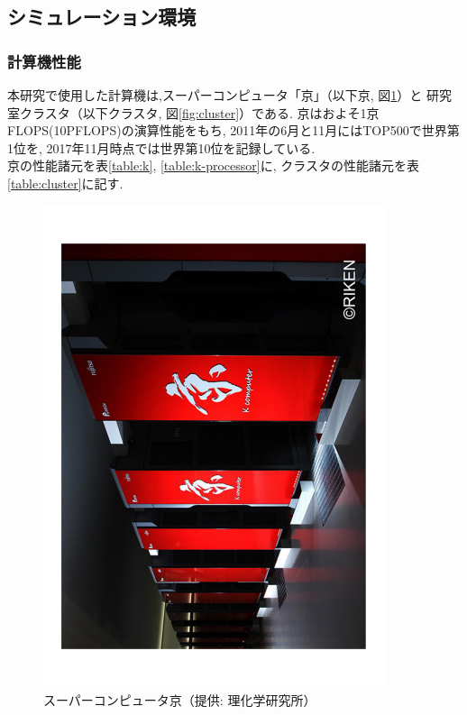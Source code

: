 \vspace{10cm}
\subsection{シミュレーション環境}
\subsubsection{計算機性能}
本研究で使用した計算機は,スーパーコンピュータ「京」（以下京, 図\ref{fig:k}）と
研究室クラスタ（以下クラスタ, 図\ref{fig:cluster}）である. 京はおよそ1京FLOPS(10PFLOPS)の演算性能をもち, 2011年の6月と11月にはTOP500\cite{top500}で世界第1位を,
2017年11月時点では世界第10位を記録している.\\
京の性能諸元\cite{riken-system}を表\ref{table:k}, \ref{table:k-processor}に, クラスタの性能諸元\cite{intel-xeon}を表\ref{table:cluster}に記す.\\

\begin{figure}[htb]
  \begin{center}
    \includegraphics[width=10.0cm, angle=-90]{./images/k}
    \caption{スーパーコンピュータ京（提供: 理化学研究所）}
    \label{fig:k}
  \end{center}
\end{figure}~\\

